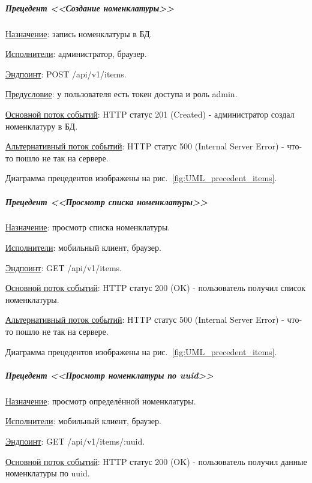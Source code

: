 
\subparagraph{Прецедент <<Создание номенклатуры>>} \hspace{0pt}

\underline{Назначение}: запись номенклатуры в БД.

\underline{Исполнители}: администратор, браузер.

\underline{Эндпоинт}: POST /api/v1/items.

\underline{Предусловие}: у пользователя есть токен доступа и роль admin.

\underline{Основной поток событий}: HTTP статус 201 (Created) - администратор создал номенклатуру в БД. 

\underline{Альтернативный поток событий}:
HTTP статус 500 (Internal Server Error) - что-то пошло не так на сервере.

Диаграмма прецедентов изображены на рис.~\ref{fig:UML_precedent_items}.


\subparagraph{Прецедент <<Просмотр списка номенклатуры>>} \hspace{0pt}

\underline{Назначение}: просмотр списка номенклатуры.

\underline{Исполнители}: мобильный клиент, браузер.

\underline{Эндпоинт}: GET /api/v1/items.


\underline{Основной поток событий}: HTTP статус 200 (OK) - пользователь получил список номенклатуры. 

\underline{Альтернативный поток событий}:
HTTP статус 500 (Internal Server Error) - что-то пошло не так на сервере.

Диаграмма прецедентов изображены на рис.~\ref{fig:UML_precedent_items}.


\subparagraph{Прецедент <<Просмотр номенклатуры по uuid>>} \hspace{0pt}

\underline{Назначение}: просмотр определённой номенклатуры.

\underline{Исполнители}: мобильный клиент, браузер.

\underline{Эндпоинт}: GET /api/v1/items/:uuid.


\underline{Основной поток событий}: HTTP статус 200 (OK) - пользователь получил данные номенклатуры по uuid. 

